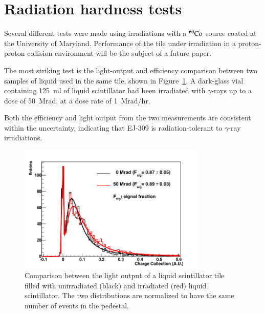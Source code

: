 \documentclass[review]{elsarticle}
\begin{document}
\section{Radiation hardness tests}

Several different tests were made using irradiations with a
$\rm{^{60}Co}$ source coated at the University of Maryland.
Performance of the tile under irradiation in a proton-proton collision
environment will be the subject of a future paper.

The most striking test is the light-output and efficiency comparison
between two samples of liquid used in the same tile, shown in
Figure~\ref{fig:ej309_irradiated}. A dark-glass vial containing 125~ml
of liquid scintillator had been irradiated with $\gamma$-rays up to a
dose of 50~Mrad, at a dose rate of 1~Mrad/hr.

Both the efficiency and light output from the two measurements are
consistent within the uncertainty, indicating that EJ-309 is
radiation-tolerant to $\gamma$-ray irradiations.

\begin{figure}[!ht]
\begin{center}
\includegraphics[width=0.8\textwidth]{./figures/RD_R7600_1_0_DBF_ALM_GRS_TH450_100814_all_1.png}
\caption{Comparison between the light output of a liquid scintillator
  tile filled with unirradiated (black) and irradiated (red) liquid
  scintillator. The two distributions are normalized to have the same
  number of events in the pedestal.}
\label{fig:ej309_irradiated}
\end{center}
\end{figure}
\end{document}
